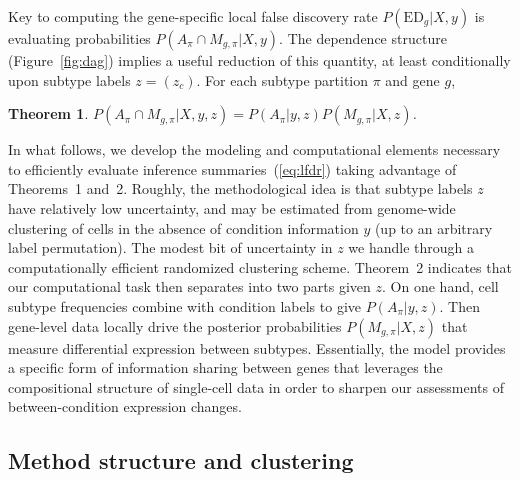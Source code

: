 \documentclass[aoas,preprint]{imsart}
\newtheorem{theorem}{Theorem}
\begin{document}
Key to computing the gene-specific 
local false discovery rate $P(\text{ED}_g|X,y)$ is
evaluating probabilities $P\left(A_\pi \cap M_{g,\pi} |X,y \right)$.
The dependence structure (Figure~\ref{fig:dag}) implies a useful reduction of this
quantity, at least conditionally upon subtype labels $z=(z_c)$. For each 
subtype partition $\pi$ and gene $g$,

\begin{theorem}  
 $P\left(A_\pi \cap M_{g,\pi} |X,y,z \right) 
  =  P\left(A_\pi |y,z \right) 
                      P\left(M_{g,\pi}| X,z \right)$.
\end{theorem}

In what follows, we develop the  modeling and computational elements necessary  to efficiently evaluate inference summaries~(\ref{eq:lfdr}) taking advantage of 
Theorems~1 and~2.  Roughly, the methodological idea is that subtype labels $z$
have relatively low uncertainty, and may be estimated from genome-wide 
clustering of cells in the absence of condition information $y$ (up to an arbitrary label permutation). 
The modest bit of uncertainty in $z$
we handle through a computationally efficient randomized clustering scheme.
 Theorem~2 indicates that our computational task then separates into
two parts given $z$.  On one hand, cell subtype frequencies 
combine with condition labels to give
$P\left(A_\pi |y,z \right)$. Then gene-level data
locally drive the posterior probabilities $P\left(M_{g,\pi}| X,z \right)$ that
measure differential expression between subtypes. 
Essentially, the model provides a specific form of information 
sharing between genes  that leverages the compositional structure of single-cell 
data in order to sharpen our assessments of between-condition expression changes. 


\subsection{Method structure and clustering}
\end{document}
